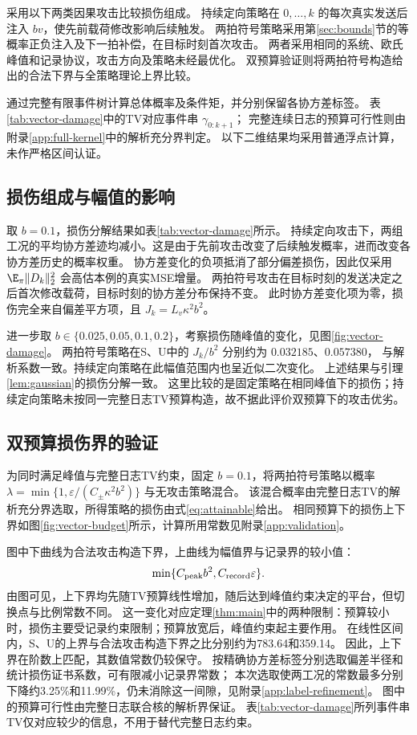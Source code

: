 采用以下两类因果攻击比较损伤组成。
持续定向策略在 $0,\ldots,k$ 的每次真实发送后注入 $bv$，使先前载荷修改影响后续触发。
两拍符号策略采用第\ref{sec:bounds}节的等概率正负注入及下一拍补偿，在目标时刻首次攻击。
两者采用相同的系统、欧氏峰值和记录协议，攻击方向及策略未经最优化。
双预算验证则将两拍符号构造给出的合法下界与全策略理论上界比较。

通过完整有限事件树计算总体概率及条件矩，并分别保留各协方差标签。
表\ref{tab:vector-damage}中的TV对应事件串 $\gamma_{0:k+1}$；
完整连续日志的预算可行性则由附录\ref{app:full-kernel}中的解析充分界判定。
以下二维结果均采用普通浮点计算，未作严格区间认证。



\subsection{损伤组成与幅值的影响}

取 $b=0.1$，损伤分解结果如表\ref{tab:vector-damage}所示。
持续定向攻击下，两组工况的平均协方差迹均减小。这是由于先前攻击改变了后续触发概率，进而改变各协方差历史的概率权重。
协方差变化的负项抵消了部分偏差损伤，因此仅采用 $\E_\pi\|D_k\|_2^2$ 会高估本例的真实MSE增量。
两拍符号攻击在目标时刻的发送决定之后首次修改载荷，目标时刻的协方差分布保持不变。
此时协方差变化项为零，损伤完全来自偏差平方项，且 $J_k=L_v\kappa^2b^2$。


进一步取 $b\in\{0.025,0.05,0.1,0.2\}$，考察损伤随峰值的变化，见图\ref{fig:vector-damage}。
两拍符号策略在S、U中的 $J_k/b^2$ 分别约为 $0.032185$、$0.057380$，
与解析系数一致。持续定向策略在此幅值范围内也呈近似二次变化。
上述结果与引理\ref{lem:gaussian}的损伤分解一致。
这里比较的是固定策略在相同峰值下的损伤；持续定向策略未按同一完整日志TV预算构造，故不据此评价双预算下的攻击优劣。




\subsection{双预算损伤界的验证}
为同时满足峰值与完整日志TV约束，固定 $b=0.1$，将两拍符号策略以概率
$\lambda=\min\{1,\varepsilon/(C_\pm\kappa^2b^2)\}$ 与无攻击策略混合。
该混合概率由完整日志TV的解析充分界选取，所得策略的损伤由式\eqref{eq:attainable}给出。
相同预算下的损伤上下界如图\ref{fig:vector-budget}所示，计算所用常数见附录\ref{app:validation}。


图中下曲线为合法攻击构造下界，上曲线为幅值界与记录界的较小值：
\[\min\{C_{\rm peak}b^2,C_{\rm record}\varepsilon\}.\]
由图可见，上下界均先随TV预算线性增加，随后达到峰值约束决定的平台，但切换点与比例常数不同。
这一变化对应定理\ref{thm:main}中的两种限制：预算较小时，损伤主要受记录约束限制；预算放宽后，峰值约束起主要作用。
在线性区间内，S、U的上界与合法攻击构造下界之比分别约为783.64和359.14。
因此，上下界在阶数上匹配，其数值常数仍较保守。
按精确协方差标签分别选取偏差半径和统计损伤证书系数，可有限减小记录界常数；
本次选取使两工况的常数最多分别下降约3.25\%和11.99\%，仍未消除这一间隙，见附录\ref{app:label-refinement}。
图中的预算可行性由完整日志联合核的解析界保证。
表\ref{tab:vector-damage}所列事件串TV仅对应较少的信息，不用于替代完整日志约束。


